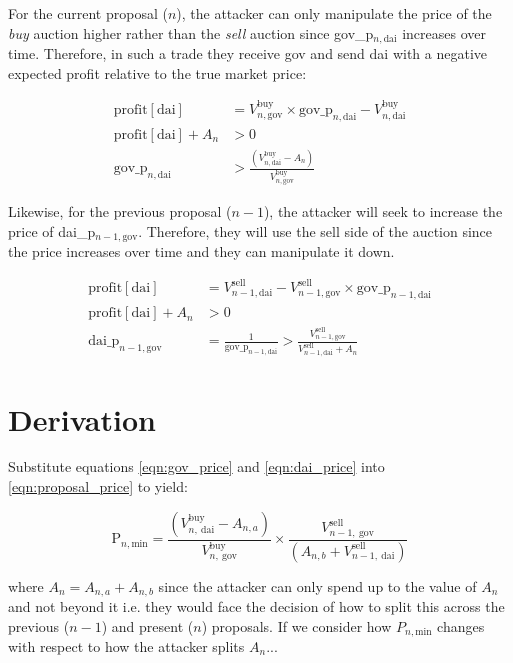 \documentclass{article}
\begin{document}
For the current proposal ($n$), the attacker can only manipulate the price of the \emph{buy} auction higher rather than the \emph{sell} auction since gov\_p$_{n,\mathrm{dai}}$ increases over time. Therefore, in such a trade they receive gov and send dai with a negative expected profit relative to the true market price:

\begin{align}
    \mathrm{profit[dai]} &= V_{n, \mathrm{gov}}^{\mathrm{buy}} \times \mathrm{gov\_p}_{n,\mathrm{dai}} - V_{n, \mathrm{dai}}^{\mathrm{buy}}\\
    \mathrm{profit[dai]} + A_n &> 0\\
    \mathrm{gov\_p}_{n,\mathrm{dai}} &> \frac{(V_{n, \mathrm{dai}}^{\mathrm{buy}} - A_n)}{ V_{n, \mathrm{gov}}^{\mathrm{buy}}} \label{eqn:gov_price}
\end{align}

Likewise, for the previous proposal ($n-1$), the attacker will seek to increase the price of dai\_p$_{n-1,\mathrm{gov}}$. Therefore, they will use the sell side of the auction since the price increases over time and they can manipulate it down.

\begin{align}
    \mathrm{profit[dai]} &= V_{n-1, \mathrm{dai}}^{\mathrm{sell}} - V_{n-1, \mathrm{gov}}^{\mathrm{sell}} \times \mathrm{gov\_p}_{n-1,\mathrm{dai}}\\
    \mathrm{profit[dai]} + A_n &> 0\\
    \mathrm{dai\_p}_{n-1,\mathrm{gov}} &= \frac{1}{\mathrm{gov\_p}_{n-1,\mathrm{dai}}} > \frac{V_{n-1, \mathrm{gov}}^{\mathrm{sell}}}{V_{n-1, \mathrm{dai}}^{\mathrm{sell}} + A_n} \label{eqn:dai_price}
\end{align}

\section{Derivation}

Substitute equations \ref{eqn:gov_price} and \ref{eqn:dai_price} into \ref{eqn:proposal_price} to yield:

\begin{equation}
\mathrm{P}_{n,\mathrm{min}} = \frac{(V_{n,\ \mathrm{dai}}^{\mathrm{buy}} - A_{n,a})}{V_{n,\ \mathrm{gov}}^{\mathrm{buy}}}  \times 
\frac{V_{n-1,\ \mathrm{gov}}^{\mathrm{sell}}} {(A_{n,b} + V_{n-1,\ \mathrm{dai}}^{\mathrm{sell}})}
\end{equation}

where $A_{n} = A_{n,a} + A_{n,b}$ since the attacker can only spend up to the value of $A_n$ and not beyond it i.e. they would face the decision of how to split this across the previous ($n-1$) and present ($n$) proposals. If we consider how $P_{n,\mathrm{min}}$ changes with respect to how the attacker splits $A_n$...
\end{document}
